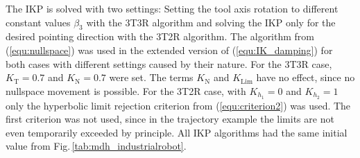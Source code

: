\documentclass[robotics,article,submit,moreauthors,pdftex]{Definitions/mdpi}
\begin{document}
The IKP is solved with two settings: Setting the tool axis rotation to different constant values $\beta_3$ with the 3T3R algorithm and solving the IKP only for the desired pointing direction with the 3T2R algorithm.
The algorithm from (\ref{equ:nullspace}) was used in the extended version of (\ref{equ:IK_damping}) for both cases with different settings caused by their nature.
For the 3T3R case, $K_\mathrm{T}=0.7$ and $K_\mathrm{N}=0.7$ were set.
The terms $K_\mathrm{N}$ and $K_\mathrm{Lim}$ have no effect, since no nullspace movement is possible.
For the 3T2R case, with $K_{h_1}=0$ and $K_{h_2}=1$ only the hyperbolic limit rejection criterion from (\ref{equ:criterion2}) was used.
The first criterion was not used, since in the trajectory example the limits are not even temporarily exceeded by principle.
All IKP algorithms had the same initial value from Fig.\,\ref{tab:mdh_industrialrobot}.
\end{document}
